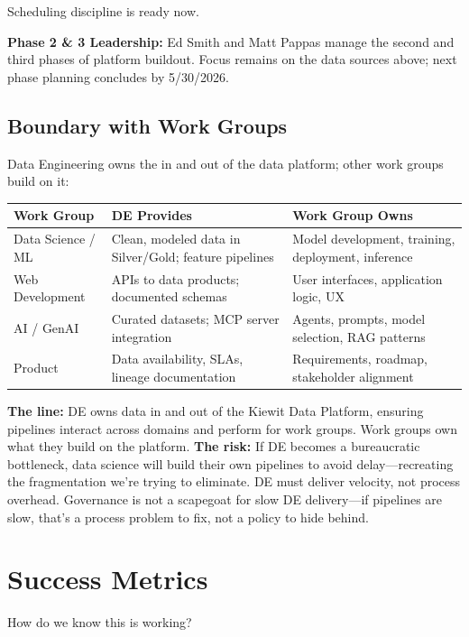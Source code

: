 \documentclass[12pt, a4paper]{article}
\begin{document}
{\small *Scheduling discipline is ready now.}

\vspace{0.5em}
\noindent \textbf{Phase 2 \& 3 Leadership:} Ed Smith and Matt Pappas manage the second and third phases of platform buildout. Focus remains on the data sources above; next phase planning concludes by 5/30/2026.

\subsection{Boundary with Work Groups}
Data Engineering owns the in and out of the data platform; other work groups build on it:

\begin{tabular}{@{}p{3cm}p{5cm}p{5.5cm}@{}}
\toprule
\textbf{Work Group} & \textbf{DE Provides} & \textbf{Work Group Owns} \\
\midrule
Data Science / ML & Clean, modeled data in Silver/Gold; feature pipelines & Model development, training, deployment, inference \\
Web Development & APIs to data products; documented schemas & User interfaces, application logic, UX \\
AI / GenAI & Curated datasets; MCP server integration & Agents, prompts, model selection, RAG patterns \\
Product & Data availability, SLAs, lineage documentation & Requirements, roadmap, stakeholder alignment \\
\bottomrule
\end{tabular}

\vspace{0.5em}
\noindent \textbf{The line:} DE owns data in and out of the Kiewit Data Platform, ensuring pipelines interact across domains and perform for work groups. Work groups own what they build on the platform.
\noindent \textbf{The risk:} If DE becomes a bureaucratic bottleneck, data science will build their own pipelines to avoid delay—recreating the fragmentation we're trying to eliminate. DE must deliver velocity, not process overhead. Governance is not a scapegoat for slow DE delivery—if pipelines are slow, that's a process problem to fix, not a policy to hide behind.

\section{Success Metrics}

How do we know this is working?
\end{document}
